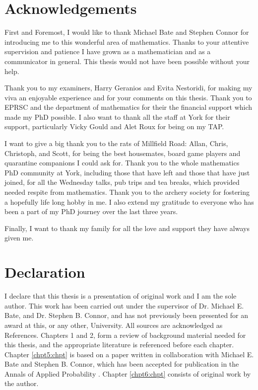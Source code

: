 \documentclass[11pt]{report}
\begin{document}
\newpage
\section*{Acknowledgements}

First and Foremost, I would like to thank Michael Bate and Stephen Connor for introducing me to this wonderful area of mathematics. Thanks to your attentive supervision and patience I have grown as a mathematician and as a communicator in general. This thesis would not have been possible without your help.

Thank you to my examiners, Harry Geranios and Evita Nestoridi, for making my viva an enjoyable experience and for your comments on this thesis. Thank you to EPRSC and the department of mathematics for their the financial support which made my PhD possible.
I also want to thank all the staff at York for their support, particularly Vicky Gould and Alet Roux for being on my TAP.  

I want to give a big thank you to the rats of Millfield Road: Allan, Chris, Christoph, and Scott, for being the best housemates, board game players and quarantine companions I could ask for. Thank you to the whole mathematics PhD community at York, including those that have left and those that have just joined, for all the Wednesday talks, pub trips and tea breaks, which provided needed respite from mathematics. Thank you to the archery society for fostering a hopefully life long hobby in me. I also extend my gratitude to everyone who has been a part of my PhD journey over the last three years.

Finally, I want to thank my family for all the love and support they have always given me.


\newpage
\section*{Declaration}

I declare that this thesis is a presentation of original work and I am the sole author. This work has been carried out under the supervisor of Dr. Michael E. Bate, and Dr. Stephen B. Connor, and has not previously been presented for an award at this, or any other, University. All sources are acknowledged as References.
Chapters 1 and 2, form a review of background material needed for this thesis, and the appropriate literature is referenced before each chapter. Chapter \ref{chpt5:chpt} is based on a paper written in collaboration with  Michael E. Bate and  Stephen B. Connor, which has been accepted for publication in the Annals of Applied Probability \cite{bate2019cutoff}. Chapter \ref{chpt6:chpt} consists of original work by the author.
\end{document}
